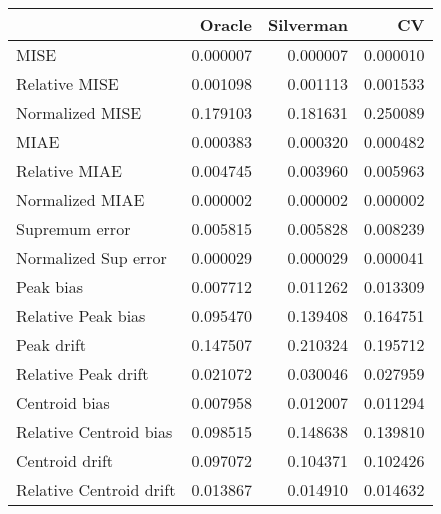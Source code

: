 \begin{tabular}{lrrr}
  \toprule
 & Oracle & Silverman & CV \\ 
  \midrule
MISE & 0.000007 & 0.000007 & 0.000010 \\ 
  Relative MISE & 0.001098 & 0.001113 & 0.001533 \\ 
  Normalized MISE & 0.179103 & 0.181631 & 0.250089 \\ 
  MIAE & 0.000383 & 0.000320 & 0.000482 \\ 
  Relative MIAE & 0.004745 & 0.003960 & 0.005963 \\ 
  Normalized MIAE & 0.000002 & 0.000002 & 0.000002 \\ 
  Supremum error & 0.005815 & 0.005828 & 0.008239 \\ 
  Normalized Sup error & 0.000029 & 0.000029 & 0.000041 \\ 
  Peak bias & 0.007712 & 0.011262 & 0.013309 \\ 
  Relative Peak bias & 0.095470 & 0.139408 & 0.164751 \\ 
  Peak drift & 0.147507 & 0.210324 & 0.195712 \\ 
  Relative Peak drift & 0.021072 & 0.030046 & 0.027959 \\ 
  Centroid bias & 0.007958 & 0.012007 & 0.011294 \\ 
  Relative Centroid bias & 0.098515 & 0.148638 & 0.139810 \\ 
  Centroid drift & 0.097072 & 0.104371 & 0.102426 \\ 
  Relative Centroid drift & 0.013867 & 0.014910 & 0.014632 \\ 
   \bottomrule
\end{tabular}
